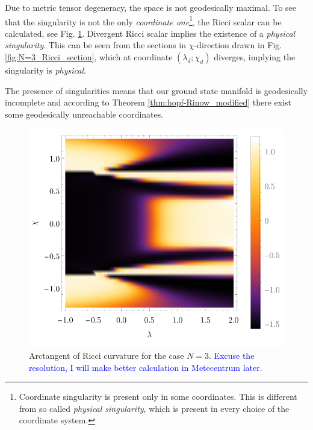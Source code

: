 Due to metric tensor degeneracy, the space is not geodesically maximal. To see that the singularity is not the only \emph{coordinate one}\footnote{Coordinate singularity is present only in some coordinates. This is different from so called \emph{physical singularity}, which is present in every choice of the coordinate system.}, the Ricci scalar can be calculated, see Fig. \ref{fig:N=3_Ricci}. Divergent Ricci scalar implies the existence of a \emph{physical singularity}. This can be seen from the sections in $\chi$-direction drawn in Fig. \ref{fig:N=3_Ricci_section}, which at coordinate $(\lambda_d;\chi_d)$ diverges, implying the singularity is \emph{physical}. 


The presence of singularities means that our ground state manifold is geodesically incomplete and according to Theorem \ref{thm:hopf-Rinow_modified} there exist some geodesically unreachable coordinates.
\begin{figure}[H]
    \centering
    \includegraphics{../img/N=3_Ricci.pdf}
    \caption{Arctangent of Ricci curvature for the case $N=3$. \textcolor{blue}{Excuse the resolution, I will make better calculation in Metecentrum later.}}
    \label{fig:N=3_Ricci}
\end{figure}

